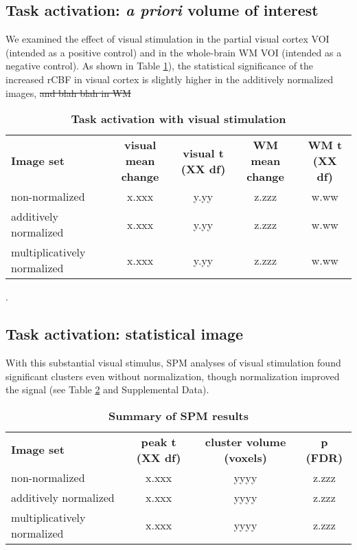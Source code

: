 \subsection{Task activation: \textit{a priori} volume of interest}
We examined the effect of visual stimulation in the partial visual cortex VOI (intended as a positive control) and in the whole-brain WM VOI (intended as a negative control). As shown in Table \ref{table:taskVOI}), the statistical significance of the increased rCBF in visual cortex is slightly higher in the additively normalized images, \sout{and blah blah in WM}

\begin{table}
\begin{tabular}{lcccc}
  \textbf{Image set} & \textbf{visual mean change} & \textbf{visual t (XX df)} &        \textbf{WM mean change} & \textbf{WM t (XX df)} \\
  non-normalized & x.xxx & y.yy & z.zzz & w.ww \\
  additively normalized & x.xxx & y.yy & z.zzz & w.ww \\
  multiplicatively normalized & x.xxx & y.yy & z.zzz & w.ww \\
\end{tabular}
\caption{\textbf{Task activation with visual stimulation}}
\label{table:taskVOI}
\end{table}
.

\subsection{Task activation: statistical image} With this substantial visual stimulus, SPM analyses of visual stimulation found significant clusters even without normalization, though normalization improved the signal (see Table \ref{table:SPMresults} and Supplemental Data).

\begin{table}
\begin{tabular}{lccc}
  \textbf{Image set} & \textbf{peak t (XX df)} & \textbf{cluster volume (voxels)} & \textbf{p (FDR)} \\
  non-normalized & x.xxx & yyyy & z.zzz \\
  additively normalized & x.xxx & yyyy & z.zzz \\
  multiplicatively normalized & x.xxx & yyyy & z.zzz \\
\end{tabular}
\caption{\textbf{Summary of SPM results}}
\label{table:SPMresults}
\end{table}
